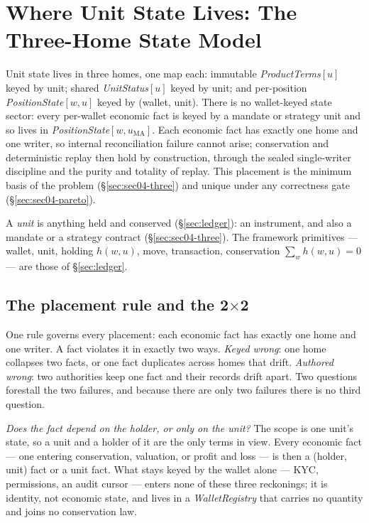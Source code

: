 \section{Where Unit State Lives: The Three-Home State Model}
\label{sec:sec04}
\label{sec:states}

Unit state lives in three homes, one map each: immutable \emph{ProductTerms}$[u]$
keyed by unit; shared \emph{UnitStatus}$[u]$ keyed by unit; and per-position
\emph{PositionState}$[w,u]$ keyed by (wallet, unit). There is no wallet-keyed state
sector: every per-wallet economic fact is keyed by a mandate or strategy unit and so
lives in \emph{PositionState}$[w,u_{\mathrm{MA}}]$. Each economic fact has exactly one
home and one writer, so internal reconciliation failure cannot arise; conservation and
deterministic replay then hold by construction, through the sealed single-writer
discipline and the purity and totality of replay. This placement is the minimum basis of
the problem (\S\ref{sec:sec04-three}) and unique under any correctness gate
(\S\ref{sec:sec04-pareto}).

A \emph{unit} is anything held and conserved (\S\ref{sec:ledger}): an instrument, and
also a mandate or a strategy contract (\S\ref{sec:sec04-three}). The framework
primitives --- wallet, unit, holding $h(w,u)$, move, transaction, conservation
$\sum_{w}h(w,u)=0$ --- are those of \S\ref{sec:ledger}.

\subsection{The placement rule and the 2\texorpdfstring{$\times$}{x}2}
\label{sec:sec04-rule}

One rule governs every placement: each economic fact has exactly one home and one
writer. A fact violates it in exactly two ways. \emph{Keyed wrong}: one home collapses
two facts, or one fact duplicates across homes that drift. \emph{Authored wrong}: two
authorities keep one fact and their records drift apart. Two questions forestall the two
failures, and because there are only two failures there is no third question.

\emph{Does the fact depend on the holder, or only on the unit?} The scope is one unit's
state, so a unit and a holder of it are the only terms in view. Every economic fact ---
one entering conservation, valuation, or profit and loss --- is then a (holder, unit)
fact or a unit fact. What stays keyed by the wallet alone --- KYC, permissions, an audit
cursor --- enters none of these three reckonings; it is identity, not economic state, and
lives in a \emph{WalletRegistry} that carries no quantity and joins no conservation law.

